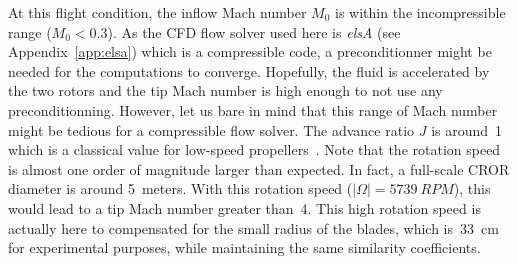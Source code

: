 At this flight condition, the inflow Mach 
number $M_0$ is within the incompressible range
($M_0 < 0.3$). As the CFD flow solver used here is \emph{elsA}
(see Appendix~\ref{app:elsa}) which is a compressible code, 
a preconditionner might be needed for the computations to converge. 
Hopefully, the fluid is accelerated by the two rotors
and the tip Mach number is high enough to not use any preconditionning.
However, let us bare in mind that this range of Mach number might
be tedious for a compressible flow solver.
The advance ratio $J$ is around~1 which is a classical value for
low-speed propellers~\cite{Bousquet2012}. Note that the rotation speed is almost
one order of magnitude larger than expected. 
In fact, a full-scale CROR diameter is around 5~meters. With this rotation speed
($|\Omega|=5739~RPM$),
this would lead to a tip Mach number greater than~4. This high rotation speed is 
actually here to compensated for the small radius of the blades, which is~33~cm
for experimental purposes, while maintaining the same similarity coefficients.
